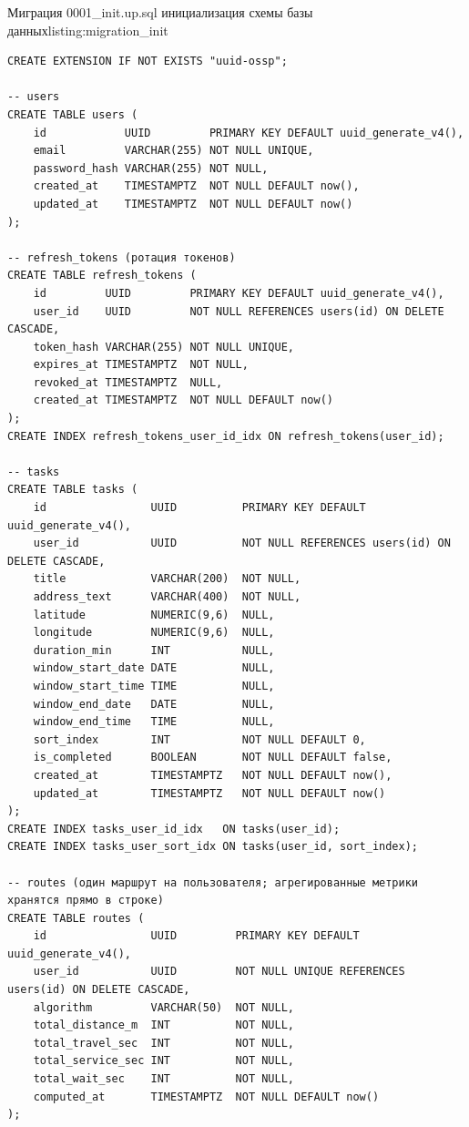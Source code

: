 \setcounter{chapter}{5}

\setcounter{listing}{0}
\renewcommand{\thelisting}{Б.\arabic{listing}}

\begin{codelisting}{Миграция 0001\_init.up.sql \textendash{} инициализация схемы базы данных}{listing:migration_init}
  \begin{verbatim}
CREATE EXTENSION IF NOT EXISTS "uuid-ossp";

-- users
CREATE TABLE users (
    id            UUID         PRIMARY KEY DEFAULT uuid_generate_v4(),
    email         VARCHAR(255) NOT NULL UNIQUE,
    password_hash VARCHAR(255) NOT NULL,
    created_at    TIMESTAMPTZ  NOT NULL DEFAULT now(),
    updated_at    TIMESTAMPTZ  NOT NULL DEFAULT now()
);

-- refresh_tokens (ротация токенов)
CREATE TABLE refresh_tokens (
    id         UUID         PRIMARY KEY DEFAULT uuid_generate_v4(),
    user_id    UUID         NOT NULL REFERENCES users(id) ON DELETE CASCADE,
    token_hash VARCHAR(255) NOT NULL UNIQUE,
    expires_at TIMESTAMPTZ  NOT NULL,
    revoked_at TIMESTAMPTZ  NULL,
    created_at TIMESTAMPTZ  NOT NULL DEFAULT now()
);
CREATE INDEX refresh_tokens_user_id_idx ON refresh_tokens(user_id);

-- tasks
CREATE TABLE tasks (
    id                UUID          PRIMARY KEY DEFAULT uuid_generate_v4(),
    user_id           UUID          NOT NULL REFERENCES users(id) ON DELETE CASCADE,
    title             VARCHAR(200)  NOT NULL,
    address_text      VARCHAR(400)  NOT NULL,
    latitude          NUMERIC(9,6)  NULL,
    longitude         NUMERIC(9,6)  NULL,
    duration_min      INT           NULL,
    window_start_date DATE          NULL,
    window_start_time TIME          NULL,
    window_end_date   DATE          NULL,
    window_end_time   TIME          NULL,
    sort_index        INT           NOT NULL DEFAULT 0,
    is_completed      BOOLEAN       NOT NULL DEFAULT false,
    created_at        TIMESTAMPTZ   NOT NULL DEFAULT now(),
    updated_at        TIMESTAMPTZ   NOT NULL DEFAULT now()
);
CREATE INDEX tasks_user_id_idx   ON tasks(user_id);
CREATE INDEX tasks_user_sort_idx ON tasks(user_id, sort_index);

-- routes (один маршрут на пользователя; агрегированные метрики хранятся прямо в строке)
CREATE TABLE routes (
    id                UUID         PRIMARY KEY DEFAULT uuid_generate_v4(),
    user_id           UUID         NOT NULL UNIQUE REFERENCES users(id) ON DELETE CASCADE,
    algorithm         VARCHAR(50)  NOT NULL,
    total_distance_m  INT          NOT NULL,
    total_travel_sec  INT          NOT NULL,
    total_service_sec INT          NOT NULL,
    total_wait_sec    INT          NOT NULL,
    computed_at       TIMESTAMPTZ  NOT NULL DEFAULT now()
);


\end{verbatim}
\end{codelisting}
